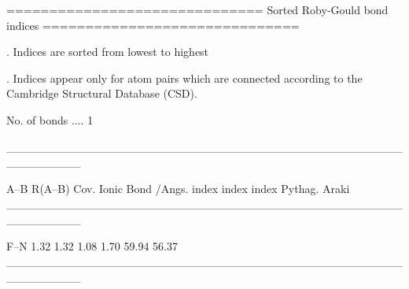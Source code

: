 
==============================
Sorted Roby-Gould bond indices
==============================

. Indices are sorted from lowest to highest

. Indices appear only for atom pairs which are connected
  according to the Cambridge Structural Database (CSD).

No. of bonds .... 1

_________________________________________________________

  A--B    R(A--B)    Cov.   Ionic   Bond    %
           /Angs.   index   index  index  Pythag.   Araki
_________________________________________________________

  F--N       1.32    1.32    1.08   1.70    59.94   56.37
_________________________________________________________
